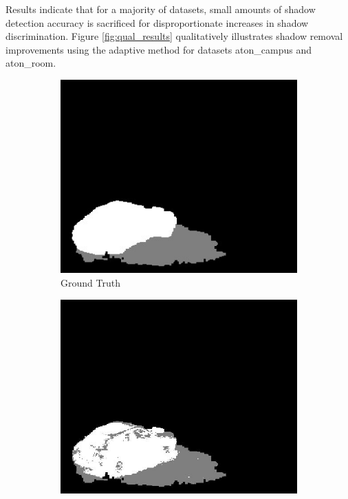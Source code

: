 Results indicate that for a majority of datasets, small amounts of shadow detection accuracy is sacrificed for disproportionate increases in shadow discrimination. Figure \ref{fig:qual_results} qualitatively illustrates shadow removal improvements using the adaptive method for datasets aton\_campus and aton\_room.

\begin{figure}
  \centering
  \begin{subfigure}{.24\linewidth}
  \includegraphics[width=1\linewidth]{figures/model/campus_0061_gt.jpg}
  \caption{Ground Truth}
  \end{subfigure}
  \hfill
  \begin{subfigure}{.24\linewidth}
  \includegraphics[width=1\linewidth]{figures/model/campus_0061_optimal.jpg}

\end{subfigure}
\end{figure}
